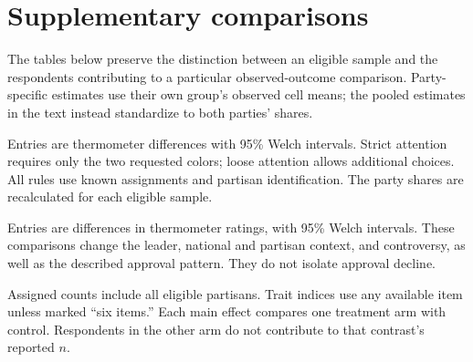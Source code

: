 \documentclass[11pt]{article}
\begin{document}


\clearpage
\appendix
\section{Supplementary comparisons}
The tables below preserve the distinction between an eligible sample and the respondents contributing to a particular observed-outcome comparison. Party-specific estimates use their own group's observed cell means; the pooled estimates in the text instead standardize to both parties' shares.

\begin{table}[!htbp]
\centering\small
\caption{MTurk attention rules: declining minus sustained approval.}
\label{tab:mtattention}
\begin{minipage}{\linewidth}\footnotesize
Entries are thermometer differences with 95\% Welch intervals. Strict attention requires only the two requested colors; loose attention allows additional choices. All rules use known assignments and partisan identification. The party shares are recalculated for each eligible sample.
\end{minipage}
\end{table}

\begin{table}[!htbp]
\centering\small
\caption{MTurk stories compared with the Ford control, by respondent party.}
\begin{minipage}{\linewidth}\footnotesize
Entries are differences in thermometer ratings, with 95\% Welch intervals. These comparisons change the leader, national and partisan context, and controversy, as well as the described approval pattern. They do not isolate approval decline.
\end{minipage}
\end{table}

\begin{table}[!htbp]
\centering\small
\caption{YouGov response counts: observed / assigned.}
\begin{minipage}{\linewidth}\footnotesize
Assigned counts include all eligible partisans. Trait indices use any available item unless marked ``six items.'' Each main effect compares one treatment arm with control. Respondents in the other arm do not contribute to that contrast's reported $n$.
\end{minipage}
\end{table}
\end{document}
